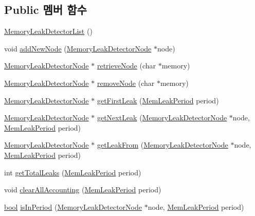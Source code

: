 \subsection*{Public 멤버 함수}
\begin{DoxyCompactItemize}
\item 
\hyperlink{struct_memory_leak_detector_list_aa7ac333862f86ab90ba352b96d81f32c}{Memory\+Leak\+Detector\+List} ()
\item 
void \hyperlink{struct_memory_leak_detector_list_a78f2e89c0db3e4216dcd2061d70dea84}{add\+New\+Node} (\hyperlink{struct_memory_leak_detector_node}{Memory\+Leak\+Detector\+Node} $\ast$node)
\item 
\hyperlink{struct_memory_leak_detector_node}{Memory\+Leak\+Detector\+Node} $\ast$ \hyperlink{struct_memory_leak_detector_list_aa1655267a6cde38557847aca1e545a77}{retrieve\+Node} (char $\ast$memory)
\item 
\hyperlink{struct_memory_leak_detector_node}{Memory\+Leak\+Detector\+Node} $\ast$ \hyperlink{struct_memory_leak_detector_list_aaa0452383ce806d8a7248cb567813f84}{remove\+Node} (char $\ast$memory)
\item 
\hyperlink{struct_memory_leak_detector_node}{Memory\+Leak\+Detector\+Node} $\ast$ \hyperlink{struct_memory_leak_detector_list_a1b95cd1a5e8372a8f795f2d3387ae065}{get\+First\+Leak} (\hyperlink{_memory_leak_detector_8h_ab248e6cc6c6699b88b002286d8a3ed76}{Mem\+Leak\+Period} period)
\item 
\hyperlink{struct_memory_leak_detector_node}{Memory\+Leak\+Detector\+Node} $\ast$ \hyperlink{struct_memory_leak_detector_list_a7dc392fbd7a84bba7ce02a5586939537}{get\+Next\+Leak} (\hyperlink{struct_memory_leak_detector_node}{Memory\+Leak\+Detector\+Node} $\ast$node, \hyperlink{_memory_leak_detector_8h_ab248e6cc6c6699b88b002286d8a3ed76}{Mem\+Leak\+Period} period)
\item 
\hyperlink{struct_memory_leak_detector_node}{Memory\+Leak\+Detector\+Node} $\ast$ \hyperlink{struct_memory_leak_detector_list_a2fce71dedaaf8904e1fa5b220587d18f}{get\+Leak\+From} (\hyperlink{struct_memory_leak_detector_node}{Memory\+Leak\+Detector\+Node} $\ast$node, \hyperlink{_memory_leak_detector_8h_ab248e6cc6c6699b88b002286d8a3ed76}{Mem\+Leak\+Period} period)
\item 
int \hyperlink{struct_memory_leak_detector_list_ae203c76563a188474a816e4ef8d8aa06}{get\+Total\+Leaks} (\hyperlink{_memory_leak_detector_8h_ab248e6cc6c6699b88b002286d8a3ed76}{Mem\+Leak\+Period} period)
\item 
void \hyperlink{struct_memory_leak_detector_list_a6c18f981e1c2139528a10aa573ffeaa9}{clear\+All\+Accounting} (\hyperlink{_memory_leak_detector_8h_ab248e6cc6c6699b88b002286d8a3ed76}{Mem\+Leak\+Period} period)
\item 
\hyperlink{avb__gptp_8h_af6a258d8f3ee5206d682d799316314b1}{bool} \hyperlink{struct_memory_leak_detector_list_af38972a8d54f899a1233d80ff0d6f52b}{is\+In\+Period} (\hyperlink{struct_memory_leak_detector_node}{Memory\+Leak\+Detector\+Node} $\ast$node, \hyperlink{_memory_leak_detector_8h_ab248e6cc6c6699b88b002286d8a3ed76}{Mem\+Leak\+Period} period)
\end{DoxyCompactItemize}
